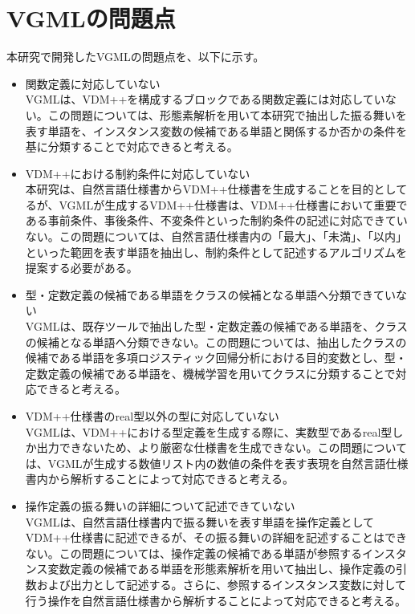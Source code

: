 \section{VGMLの問題点}
本研究で開発したVGMLの問題点を、以下に示す。

\begin{itemize}
	\item 関数定義に対応していない\\VGMLは、VDM++を構成するブロックである関数定義には対応していない。この問題については、形態素解析を用いて本研究で抽出した振る舞いを表す単語を、インスタンス変数の候補である単語と関係するか否かの条件を基に分類することで対応できると考える。
	\item VDM++における制約条件に対応していない\\本研究は、自然言語仕様書からVDM++仕様書を生成することを目的としてるが、VGMLが生成するVDM++仕様書は、VDM++仕様書において重要である事前条件、事後条件、不変条件といった制約条件の記述に対応できていない。この問題については、自然言語仕様書内の「最大」、「未満」、「以内」といった範囲を表す単語を抽出し、制約条件として記述するアルゴリズムを提案する必要がある。
	\item 型・定数定義の候補である単語をクラスの候補となる単語へ分類できていない\\VGMLは、既存ツールで抽出した型・定数定義の候補である単語を、クラスの候補となる単語へ分類できない。この問題については、抽出したクラスの候補である単語を多項ロジスティック回帰分析における目的変数とし、型・定数定義の候補である単語を、機械学習を用いてクラスに分類することで対応できると考える。
	\item VDM++仕様書のreal型以外の型に対応していない\\VGMLは、VDM++における型定義を生成する際に、実数型であるreal型しか出力できないため、より厳密な仕様書を生成できない。この問題については、VGMLが生成する数値リスト内の数値の条件を表す表現を自然言語仕様書内から解析することによって対応できると考える。
	\item 操作定義の振る舞いの詳細について記述できていない\\VGMLは、自然言語仕様書内で振る舞いを表す単語を操作定義としてVDM++仕様書に記述できるが、その振る舞いの詳細を記述することはできない。この問題については、操作定義の候補である単語が参照するインスタンス変数定義の候補である単語を形態素解析を用いて抽出し、操作定義の引数および出力として記述する。さらに、参照するインスタンス変数に対して行う操作を自然言語仕様書から解析することによって対応できると考える。
\end{itemize}

